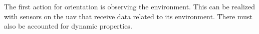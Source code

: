 The first action for orientation is observing the environment. This can be realized with sensors on the \acs{uav} that receive data related to its environment. There must also be accounted for dynamic properties.